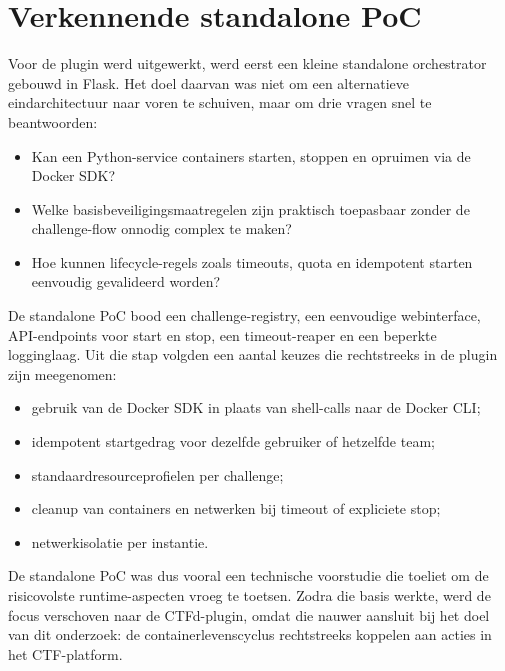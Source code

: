 \section{Verkennende standalone PoC}%
\label{sec:poc-standalone}

Voor de plugin werd uitgewerkt, werd eerst een kleine standalone orchestrator gebouwd in Flask. Het doel daarvan was niet om een alternatieve eindarchitectuur naar voren te schuiven, maar om drie vragen snel te beantwoorden:

\begin{itemize}
  \item Kan een Python-service containers starten, stoppen en opruimen via de Docker SDK?
  \item Welke basisbeveiligingsmaatregelen zijn praktisch toepasbaar zonder de challenge-flow onnodig complex te maken?
  \item Hoe kunnen lifecycle-regels zoals timeouts, quota en idempotent starten eenvoudig gevalideerd worden?
\end{itemize}

De standalone PoC bood een challenge-registry, een eenvoudige webinterface, API-endpoints voor start en stop, een timeout-reaper en een beperkte logginglaag. Uit die stap volgden een aantal keuzes die rechtstreeks in de plugin zijn meegenomen:

\begin{itemize}
  \item gebruik van de Docker SDK in plaats van shell-calls naar de Docker CLI;
  \item idempotent startgedrag voor dezelfde gebruiker of hetzelfde team;
  \item standaardresourceprofielen per challenge;
  \item cleanup van containers en netwerken bij timeout of expliciete stop;
  \item netwerkisolatie per instantie.
\end{itemize}

De standalone PoC was dus vooral een technische voorstudie die toeliet om de risicovolste runtime-aspecten vroeg te toetsen. Zodra die basis werkte, werd de focus verschoven naar de CTFd-plugin, omdat die nauwer aansluit bij het doel van dit onderzoek: de containerlevenscyclus rechtstreeks koppelen aan acties in het CTF-platform.

